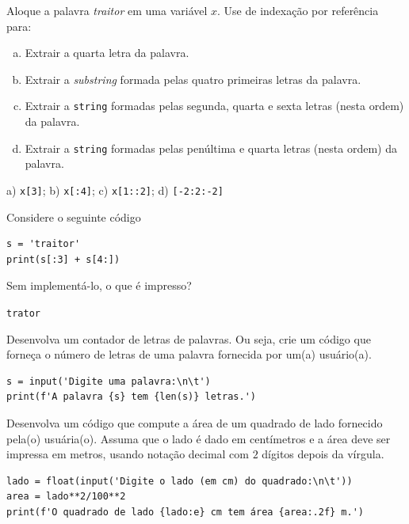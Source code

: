 \begin{exer}
  Aloque a palavra \textit{traitor} em uma variável $x$. Use de indexação por referência para:
  \begin{enumerate}[a)]
  \item Extrair a quarta letra da palavra.
  \item Extrair a \textit{substring} formada pelas quatro primeiras letras da palavra.
  \item Extrair a \texttt{string} formadas pelas segunda, quarta e sexta letras (nesta ordem) da palavra.
  \item Extrair a \texttt{string} formadas pelas penúltima e quarta letras (nesta ordem) da palavra.
  \end{enumerate}
\end{exer}
\begin{resp}
  a) \lstinline+x[3]+; b) \lstinline+x[:4]+; c) \lstinline+x[1::2]+; d) \lstinline+[-2:2:-2]+
\end{resp}

\begin{exer}
  Considere o seguinte código

  \begin{lstlisting}
s = 'traitor'
print(s[:3] + s[4:])
\end{lstlisting}

Sem implementá-lo, o que é impresso?
\end{exer}
\begin{resp}
  \lstinline+trator+
\end{resp}

\begin{exer}
  Desenvolva um contador de letras de palavras. Ou seja, crie um código que forneça o número de letras de uma palavra fornecida por um(a) usuário(a).
\end{exer}
\begin{resp}

\begin{lstlisting}
s = input('Digite uma palavra:\n\t')
print(f'A palavra {s} tem {len(s)} letras.')
\end{lstlisting}

\end{resp}

\begin{exer}
  Desenvolva um código que compute a área de um quadrado de lado fornecido pela(o) usuária(o). Assuma que o lado é dado em centímetros e a área deve ser impressa em metros, usando notação decimal com $2$ dígitos depois da vírgula.
\end{exer}
\begin{resp}

\begin{lstlisting}
lado = float(input('Digite o lado (em cm) do quadrado:\n\t'))
area = lado**2/100**2
print(f'O quadrado de lado {lado:e} cm tem área {area:.2f} m.')
\end{lstlisting}

\end{resp}

